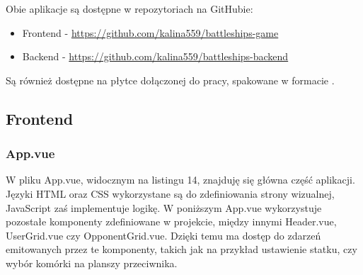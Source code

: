 
Obie aplikacje są dostępne w repozytoriach na GitHubie:
\begin{itemize}
    \item Frontend - \url{https://github.com/kalina559/battleships-game}
    \item Backend - \url{https://github.com/kalina559/battleships-backend}
\end{itemize}

Są również dostępne na płytce dołączonej do pracy, spakowane w formacie .

\subsection{Frontend}

\subsubsection{App.vue}

W pliku App.vue, widocznym na listingu 14, znajduję się główna część aplikacji. Języki HTML oraz CSS wykorzystane są do zdefiniowania strony wizualnej, JavaScript zaś implementuje logikę. W poniższym 
App.vue wykorzystuje pozostałe komponenty zdefiniowane w projekcie, między innymi Header.vue, UserGrid.vue czy OpponentGrid.vue. Dzięki temu ma dostęp do zdarzeń emitowanych przez te komponenty, takich jak na przykład ustawienie statku, czy wybór komórki na planszy przeciwnika.


